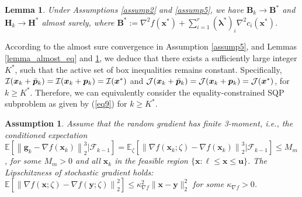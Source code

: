 \documentclass[aos]{imsart}
\numberwithin{equation}{section}
\theoremstyle{plain}
\newtheorem{assumption}{Assumption}
\newtheorem{lemma}{Lemma}
\begin{document}
\begin{lemma}
\label{lemma_almostsure_HB}
    Under Assumptions \ref{assump2} and \ref{assump5}, we have  $\bm{B}_k \to \bm{B}^{*}$ and $\bm{H}_k \to \bm{H}^{*}$ almost surely, where $\bm{B}^{*} := \nabla^2 f(\bm{x}^{*}) + \sum_{i=1}^{r} (\bm{\lambda}^{*})_{i} \nabla^2 c_i(\bm{x}^{*})$.
\end{lemma}

According to the almost sure convergence in Assumption \ref{assump5}, and Lemmas \ref{lemma_almost_eq} and \ref{lemma_almostsure_HB}, we deduce that there exists a sufficiently large integer $K^{*}$, such that the active set of box inequalities remains constant. Specifically, $\mathcal{I}(\bm{x}_k + \Bar{\bm{p}}_k) = \mathcal{I}(\bm{x}_k + \bm{p}_k) = \mathcal{I}(\bm{x}^{*})$ and $\mathcal{J}(\bm{x}_k + \Bar{\bm{p}}_k) = \mathcal{J}(\bm{x}_k + \bm{p}_k) = \mathcal{J}(\bm{x}^{*})$, for $k \geq K^{*}$. Therefore, we can equivalently consider the equality-constrained SQP subproblem as given by (\ref{eq9}) for $k \geq K^{*}$.



\begin{assumption}
\label{assump9}
   Assume that the random gradient has finite 3-moment, i.e., the conditioned expectation $\mathbb{E}\left[ \left\|\bm{g}_k - \nabla f(\bm{x}_k) \right\|_2^3 | \mathcal{F}_{k-1} \right] = \mathbb{E}_{\zeta}\left[ \left\| \nabla f(\bm{x}_k; \zeta)  - \nabla f(\bm{x}_k) \right\|_2^3 | \mathcal{F}_{k-1} \right] \leq M_{m}$, for some $M_{m}>0$ and all $\bm{x}_k$ in the feasible region $\{\bm{x}: \bm{\ell} \leq \bm{x} \leq \bm{u}\}$. The Lipschitzness of stochastic gradient holds: $\mathbb{E}\left[ \left\| \nabla f(\bm{x};\zeta) - \nabla f(\bm{y};\zeta) \right\|_2^2 \right] \leq \kappa_{\nabla f}^2 \|\bm{x} - \bm{y}\|_2^2$ for some $\kappa_{\nabla f} > 0$.
\end{assumption}
\end{document}
